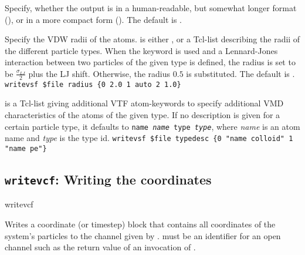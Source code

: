 \begin{arguments}
\item[\opt{\alt{short \asep verbose}}]
  Specify, whether the output is in a human-readable, but somewhat
  longer format (), or in a more compact form
  (). The default is .
  
\item[\opt{radius \alt{\var{radii} \asep auto}}] Specify the VDW radii
  of the atoms.  is either , or a Tcl-list
  describing the radii of the different particle types. When the
  keyword  is used and a Lennard-Jones interaction
  between two particles of the given type is defined, the radius is
  set to be $\frac{\sigma_{LJ}}{2}$ plus the LJ shift.  Otherwise, the
  radius $0.5$ is substituted. The default is .
  \verb!writevsf $file radius {0 2.0 1 auto 2 1.0}!

\item[\opt{typedesc \var{typedesc}}]
   is a Tcl-list giving additional VTF atom-keywords to
  specify additional VMD characteristics of the atoms of the given type.
  If no description is given for a certain particle type, it defaults to
  \texttt{name \textit{name} type \textit{type}}, where \textit{name}
  is an atom name and \textit{type} is the type id.
  \verb!writevsf $file typedesc {0 "name colloid" 1 "name pe"}!
\end{arguments}

\subsection{\texttt{writevcf}: Writing  the coordinates}

\begin{essyntax}
  writevcf  
\end{essyntax}
Writes a coordinate (or timestep) block that contains all coordinates
of the system's particles to the channel given by .
 must be an identifier for an open channel such as the
return value of an invocation of .

